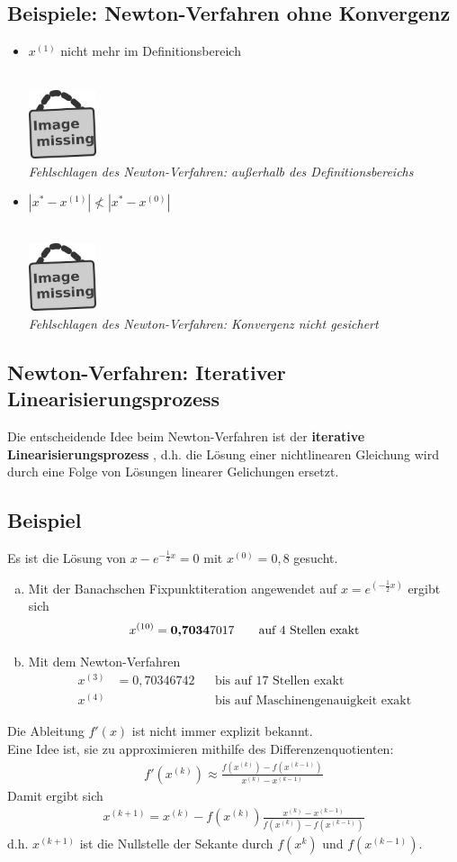\documentclass[ngerman,fontsize=11pt, paper=a4, parskip=half, titlepage=true, toc=bib]{scrbook}
\newcommand{\imagemissing}[1]{
	\begin{center}~\\
		\centering 
		\includegraphics[width=2cm]{images/image_missing.jpg}\\
		\textit{#1} \\
	\end{center}
}
\begin{document}

	\subsection{Beispiele: Newton-Verfahren ohne Konvergenz}
	\begin{itemize}
		\item $x^{(1)}$ nicht mehr im Definitionsbereich
			\imagemissing{Fehlschlagen des Newton-Verfahren: außerhalb des Definitionsbereichs}
		\item $|x^{*}-x^{(1)}| \nless |x^{*}-x^{(0)}| $
			\imagemissing{Fehlschlagen des Newton-Verfahren: Konvergenz nicht gesichert}
	\end{itemize}
	
	\subsection{Newton-Verfahren: Iterativer Linearisierungsprozess}
	Die entscheidende Idee beim Newton-Verfahren ist der \textbf{iterative Linearisierungsprozess}
	, d.h. die Lösung einer nichtlinearen Gleichung wird
	durch eine Folge von Lösungen linearer Gelichungen ersetzt.
	
	\subsection{Beispiel}\label{5.4.6}
	Es ist die Lösung von $x-e^{-\frac{1}{2}x}=0$ mit $x^{(0)}=0,8$ gesucht.
	\begin{enumerate}[a)]
		\item Mit der Banachschen Fixpunktiteration angewendet auf 
				$x=e^{(-\frac{1}{2}x)}$ ergibt sich
				\begin{gather*}
					x^{(10)}=\text{\bfseries 0,7034}7017 
					\qquad \text{auf 4 Stellen exakt}
				\end{gather*}
		\item Mit dem Newton-Verfahren
		\begin{align*}
			x^{(3)}&= 0,70346742 &&\text{bis auf 17 Stellen exakt}\\
			x^{(4)} &&& \text{bis auf Maschinengenauigkeit exakt}
		\end{align*}		
	\end{enumerate}
	Die Ableitung $f'(x)$ ist nicht immer explizit bekannt. \\
	Eine Idee ist, sie zu approximieren mithilfe des Differenzenquotienten:
	\begin{gather*}
		f'(x^{(k)})  \approx \frac{f(x^{(k)})-f(x^{(k-1)})}{x^{(k)}-x^{(k-1)}}
	\end{gather*}
	Damit ergibt sich
	\begin{gather*}
		x^{(k+1)} = x^{(k)}-f(x^{(k)}) \frac{x^{(k)} - x^{(k-1)}}{f(x^{(k)})-f(x^{(k-1)})}
	\end{gather*}
	d.h. $x^{(k+1)} $ ist die Nullstelle der Sekante durch $f(x^{k})$ und $f(x^{(k-1)})$.
	
\end{document}
